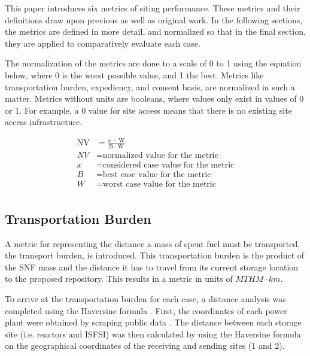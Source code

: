 This paper introduces six metrics of siting performance. These metrics and 
their definitions draw upon previous 
\cite{freeze_siting_2015,waleed_regional_2015} as well as original work.  In 
the following sections, the metrics are defined in more detail, and normalized
so that in the final section, they are applied to comparatively evaluate each case.

The normalization of the metrics are done to a scale of 0 to 1 using the equation
below, where 0 is the worst possible value, and 1 the best. 
 Metrics like transportation burden, expediency, and consent basis,
 are normalized in such a matter. Metrics without units are booleans, where values 
 only exist in values of 0 or 1. For example, a 0 value for site access means 
that there is no existing site access infrastructure.


\begin{align} 
	\mbox{NV} &= \frac{x-\mbox{W}}{\mbox{B}-\mbox{W}}\\
	NV &= \mbox{normalized value for the metric}\\
	x &= \mbox{considered case value for the metric}\\
	B &= \mbox{best case value for the metric}\\
	W &= \mbox{worst case value for the metric}\\
\end{align}



\subsection{Transportation Burden}
 A metric 
 for representing the distance a mass of spent fuel must be transported, the 
 transport burden, is introduced. This transportation burden is the product 
 of the \gls{SNF} mass and the distance it has to travel from its current 
 storage location to the proposed repository. This results in a 
 metric in units of $MTHM\cdot km$. 

 To arrive at the transportation burden for each case, a distance analysis was 
 completed using the Haversine formula \cite{shumaker_astronomical_1984}. 
 First, the coordinates of each power plant were obtained by scraping public 
 data \cite{nuclear_regulatory_commission_nrc:_2016}.  The distance between each storage site (i.e. reactors 
 and \gls{ISFSI}) was then calculated by using the Haversine formula on the 
 geographical coordinates of the receiving and sending sites (1 and 2). 

